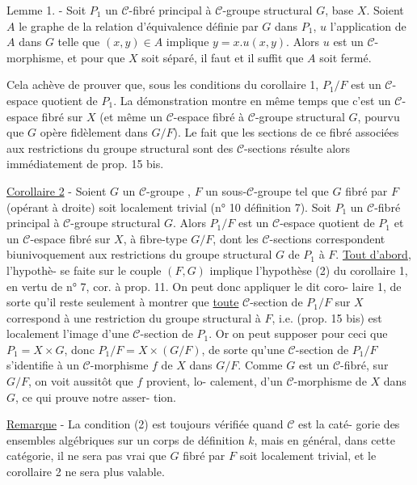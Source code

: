 Lemme 1. - Soit $P_1$ un $\mathcal{C}$-fibré principal à $\mathcal{C}$-groupe structural $G$,
base $X$. Soient $A$ le graphe de la relation d'équivalence définie par $G$
dans $P_1$, $u$ l'application de $A$ dans $G$ telle que $(x,y) \in A$ implique
$y = x.u(x,y)$. Alors $u$ est un $\mathcal{C}$-morphisme, et pour que $X$ soit séparé, il
faut et il suffit que $A$ soit fermé.

\newpage



Cela achève de prouver que, sous les conditions du corollaire 1,
$P_1/F$ est un $\mathcal{C}$-espace quotient de $P_1$. La démonstration montre en même
temps que c'est un $\mathcal{C}$-espace fibré sur $X$ (et même un $\mathcal{C}$-espace fibré
à $\mathcal{C}$-groupe structural $G$, pourvu que $G$ opère fidèlement dans $G/F$). Le
fait que les sections de ce fibré associées aux restrictions du groupe
structural sont des $\mathcal{C}$-sections résulte alors immédiatement de prop.
15 bis.

\underline{Corollaire 2} - Soient $G$ un $\mathcal{C}$-groupe , $F$ un sous-$\mathcal{C}$-groupe tel que $G$
fibré par $F$ (opérant à droite) soit localement trivial (n° 10 définition
7). Soit $P_1$ un $\mathcal{C}$-fibré principal à $\mathcal{C}$-groupe structural $G$. Alors
$P_1/F$ est un $\mathcal{C}$-espace quotient de $P_1$ et un $\mathcal{C}$-espace fibré sur $X$, à
fibre-type $G/F$, dont les $\mathcal{C}$-sections correspondent biunivoquement aux
restrictions du groupe structural $G$ de $P_1$ à $F$. \underline{Tout d'abord}, l'hypothè-
se faite sur le couple $(F,G)$ implique l'hypothèse (2) du corollaire 1,
en vertu de n° 7, cor. à prop. 11. On peut donc appliquer le dit coro-
laire 1, de sorte qu'il reste seulement à montrer que \underline{toute} $\mathcal{C}$-section
de $P_1/F$ sur $X$ correspond à une restriction du groupe structural à $F$, i.e.
(prop. 15 bis) est localement l'image d'une $\mathcal{C}$-section de $P_1$. Or on
peut supposer pour ceci que $P_1 = X \times G$, donc $P_1/F = X \times (G/F)$, de sorte
qu'une $\mathcal{C}$-section de $P_1/F$ s'identifie à un $\mathcal{C}$-morphisme $f$ de $X$ dans $G/F$.
Comme $G$ est un $\mathcal{C}$-fibré, sur $G/F$, on voit aussitôt que $f$ provient, lo-
calement, d'un $\mathcal{C}$-morphisme de $X$ dans $G$, ce qui prouve notre asser-
tion.

\underline{Remarque} - La condition (2) est toujours vérifiée quand $\mathcal{C}$ est la caté-
gorie des ensembles algébriques sur un corps de définition $k$, mais en
général, dans cette catégorie, il ne sera pas vrai que $G$ fibré par $F$
soit localement trivial, et le corollaire 2 ne sera plus valable.

